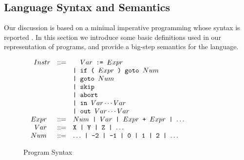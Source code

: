 \subsection{Language Syntax and Semantics}
Our discussion is based on a minimal imperative programming whose syntax is reported . In this section we introduce some basic definitions used in our representation of programs, and provide a big-step semantics for the language.





\ifdefined\noauthorea
\begin{figure}[t]
\fi
\noindent
\begin{small}
$
\begin{array}{rcl}
\texttt{$Instr$} & ::= & \hphantom{\texttt{| }}\texttt{$Var$ := $Expr$} \\
& & \texttt{| if ( $Expr$ ) goto $Num$} \\
& & \texttt{| goto $Num$} \\
& & \texttt{| skip} \\
& & \texttt{| abort} \\
& & \texttt{| in $Var\cdots Var$} \\ 
& & \texttt{| out $Var\cdots Var$} \\
\texttt{ $Expr$ } & ::= & \texttt{$Num$ | $Var$ | $Expr$ + $Expr$ | $\ldots$ } \\
\texttt{ $Var$ } & ::= & \texttt{X | Y | Z | $\ldots$} \\
\texttt{ $Num$ } & ::= & \texttt{$\ldots$ | -2 | -1 | 0 | 1 | 2 | $\ldots$} \\
\end{array}
$
\end{small}
\ifdefined\noauthorea
\caption{\label{fig:osr-program-syntax}Program Syntax}
\end{figure}
\fi

